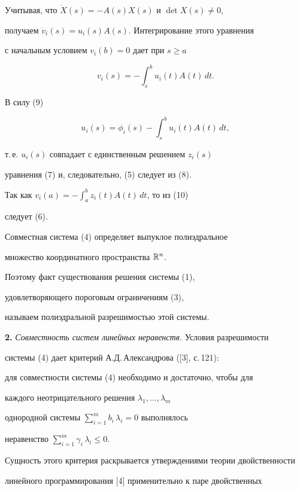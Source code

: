 Учитывая, что $\Dot X(s)=-A(s)X(s)$ и $\det X(s)\neq 0$,


получаем $\Dot v_i(s)=u_i(s)A(s)$. Интегрирование этого уравнения


с начальным условием $v_i(b)=0$ дает при $s\ge a$


$$


v_i(s)=-\int_s^b u_i(t)A(t)\,dt.


$$


В силу (9)


$$


u_i(s)=\phi_i(s)-\int_s^b u_i(t)A(t)\,dt,


$$


т.\,е. $u_i(s)$ совпадает с единственным решением $z_i(s)$


уравнения (7) и, следовательно, (5) следует из (8).


Так как $v_i(a)=-\int_a^b z_i(t)A(t)\,dt$, то из (10)


следует (6).





Совместная система (4) определяет выпуклое полиэдральное


множество координатного пространства $\Bbb R^n$.


Поэтому факт существования решения системы (1),


удовлетворяющего пороговым ограничениям (3),


называем полиэдральной разрешимостью этой системы.


\bigskip





{\bf 2.} {\it Совместность систем линейных неравенств.} Условия разрешимости


системы (4) дает критерий А.Д.\,Александрова ([3], с.\,121):


для совместности системы (4) необходимо и достаточно, чтобы для


каждого неотрицательного решения $\lambda_1,\dotsc,\lambda_m$


однородной системы $\sum\limits_{i=1}^m b_i\,\lambda_i=0$ выполнялось


неравенство $\sum\limits_{i=1}^m \gamma_i\,\lambda_i\le 0$.





Сущность этого критерия раскрывается утверждениями теории двойственности


линейного программирования [4] применительно к паре двойственных


